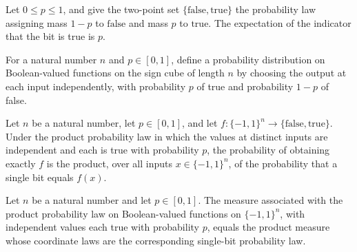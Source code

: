 \begin{theorem}
\label{FABL.pmfExpectation_pBiasedBitPMF_zeroOneValue}
\leanok
{}
Let $0\leq p\leq 1$, and give the two-point set $\{\mathrm{false},\mathrm{true}\}$ the
probability law assigning mass $1-p$ to $\mathrm{false}$ and mass $p$ to
$\mathrm{true}$. The expectation of the indicator that the bit is true is $p$.
\end{theorem}

\begin{definition}
\label{FABL.pBiasedRandomFunctionPMF}
\leanok
{}
For a natural number $n$ and $p\in[0,1]$, define a probability distribution on
Boolean-valued functions on the sign cube of length $n$ by choosing the output at each
input independently, with probability $p$ of true and probability $1-p$ of false.
\end{definition}

\begin{theorem}
\label{FABL.pBiasedRandomFunctionPMF_apply}
\leanok
{}
Let $n$ be a natural number, let $p\in[0,1]$, and let
$f:\{-1,1\}^n\to\{\mathrm{false},\mathrm{true}\}$. Under the product probability law in
which the values at distinct inputs are independent and each is true with probability
$p$, the probability of obtaining exactly $f$ is the product, over all inputs
$x\in\{-1,1\}^n$, of the probability that a single bit equals $f(x)$.
\end{theorem}

\begin{theorem}
\label{FABL.pBiasedRandomFunctionPMF_toMeasure}
\leanok
{}
Let $n$ be a natural number and let $p\in[0,1]$. The measure associated with the product
probability law on Boolean-valued functions on $\{-1,1\}^n$, with independent values
each true with probability $p$, equals the product measure whose coordinate laws are the
corresponding single-bit probability law.
\end{theorem}

